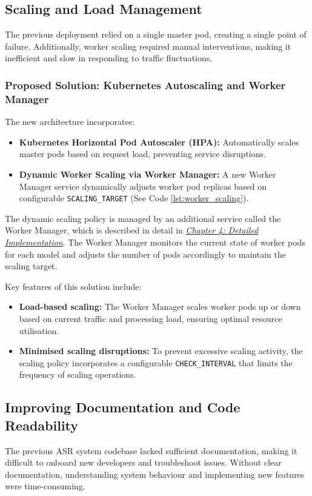 \subsection{Scaling and Load Management}
The previous deployment relied on a single master pod, creating a single point of failure. Additionally, worker scaling required manual interventions, making it inefficient and slow in responding to traffic fluctuations.

\subsubsection{Proposed Solution: Kubernetes Autoscaling and Worker Manager}
The new architecture incorporates:
\begin{itemize}
    \item \textbf{Kubernetes Horizontal Pod Autoscaler (HPA):} Automatically scales master pods based on request load, preventing service disruptions.
    \item \textbf{Dynamic Worker Scaling via Worker Manager:} A new Worker Manager service dynamically adjusts worker pod replicas based on configurable \texttt{SCALING\_TARGET} (See Code \ref{lst:worker_scaling}).
\end{itemize}

The dynamic scaling policy is managed by an additional service called the Worker Manager, which is described in detail in \hyperref[section:worker_manager]{\textit{Chapter 4: Detailed Implementation}}. The Worker Manager monitors the current state of worker pods for each model and adjusts the number of pods accordingly to maintain the scaling target.

Key features of this solution include:
\begin{itemize}
    \item \textbf{Load-based scaling:} The Worker Manager scales worker pods up or down based on current traffic and processing load, ensuring optimal resource utilisation.
    \item \textbf{Minimised scaling disruptions:} To prevent excessive scaling activity, the scaling policy incorporates a configurable \texttt{CHECK\_INTERVAL} that limits the frequency of scaling operations.
\end{itemize}

\subsection{Improving Documentation and Code Readability}
The previous ASR system codebase lacked sufficient documentation, making it difficult to onboard new developers and troubleshoot issues. Without clear documentation, understanding system behaviour and implementing new features were time-consuming.


